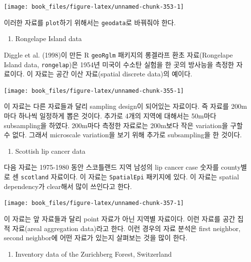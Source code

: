 \documentclass[b5paper,]{scrbook}
\providecommand{\tightlist}{%
  \setlength{\itemsep}{0pt}\setlength{\parskip}{0pt}}
\theoremstyle{plain}
\theoremstyle{definition}
\numberwithin{equation}{section}
\begin{document}
\begin{center}\texttt{[image: book\_files/figure-latex/unnamed-chunk-353-1]} \end{center}

이러한 자료를 \texttt{plot}하기 위해서는 \texttt{geodata}로 바꿔줘야 한다.

\begin{enumerate}
\def\labelenumi{\arabic{enumi}.}
\setcounter{enumi}{1}
\tightlist
\item
  Rongelape Island data
\end{enumerate}

Diggle et al. (1998)이 만든 R \texttt{geoRglm} 패키지의 롱겔라프 환초 자료(Rongelape Island data, \texttt{rongelap})은 1954년 미국이 수소탄 실험을 한 곳의 방사능을 측정한 자료이다. 이 자료는 공간 이산 자료(spatial discrete data)의 예이다.

\begin{center}\texttt{[image: book\_files/figure-latex/unnamed-chunk-355-1]} \end{center}

이 자료는 다른 자료들과 달리 sampling design이 되어있는 자료이다. 즉 자료를 200m마다 하나씩 일정하게 뽑은 것이다. 추가로 4개의 지역에 대해서는 50m마다 subsampling을 하였다. 200m마다 측정한 자료로는 200m보다 작은 variation을 구할 수 없다. 그래서 microscale variation을 보기 위해 추가로 subsampling을 한 것이다.

\begin{enumerate}
\def\labelenumi{\arabic{enumi}.}
\setcounter{enumi}{2}
\tightlist
\item
  Scottish lip cancer data
\end{enumerate}

다음 자료는 1975-1980 동안 스코틀랜드 지역 남성의 lip cancer case 숫자를 county별로 센 \texttt{scotland} 자료이다. 이 자료는 \texttt{SpatialEpi} 패키지에 있다. 이 자료는 spatial dependency가 clear해서 많이 쓰인다고 한다.

\begin{center}\texttt{[image: book\_files/figure-latex/unnamed-chunk-357-1]} \end{center}

이 자료는 앞 자료들과 달리 point 자료가 아닌 지역별 자료이다. 이런 자료를 공간 집적 자료(areal aggregation data)라고 한다. 이런 경우의 자료 분석은 first neighbor, second neighbor에 어떤 자료가 있는지 살펴보는 것을 많이 한다.

\begin{enumerate}
\def\labelenumi{\arabic{enumi}.}
\setcounter{enumi}{3}
\tightlist
\item
  Inventory data of the Zurichberg Forest, Switzerland
\end{enumerate}
\end{document}
